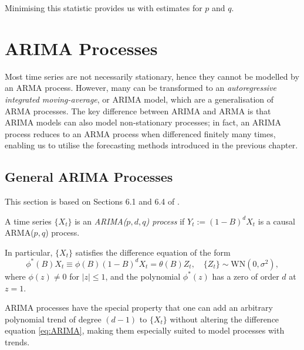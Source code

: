 \documentclass[a4paper, oneside]{discothesis}
\begin{document}
Minimising this statistic provides us with estimates for $p$ and $q$.


\chapter{ARIMA Processes} \label{chap:ARIMA}
Most time series are not necessarily stationary, hence they cannot be modelled by an ARMA process. However, many can be transformed to an \textit{autoregressive integrated moving-average}, or ARIMA model, which are a generalisation of ARMA processes. The key difference between ARIMA and ARMA is that ARIMA models can also model non-stationary processes; in fact, an ARIMA process reduces to an ARMA process when differenced finitely many times, enabling us to utilise the forecasting methods introduced in the previous chapter.

\section{General ARIMA Processes}
This section is based on Sections 6.1 and 6.4 of \cite{itsf}.
\begin{definition}
	A time series $\{X_t\}$ is an \textit{ARIMA($p, d, q$) process} if $Y_t := (1-B)^d X_t$ is a causal ARMA($p, q$) process.
\end{definition}

In particular, $\{X_t\}$ satisfies the difference equation of the form
\begin{equation}
    \label{eq:ARIMA}\phi^*(B)X_t \equiv \phi(B)(1-B)^dX_t = \theta(B)Z_t, \quad \{Z_t\} \sim \mathrm{WN}(0, \sigma^2),
\end{equation}
where $\phi(z) \neq 0$ for $|z| \leq 1$, and the polynomial $\phi^*(z)$ has a zero of order $d$ at $z=1$.

ARIMA processes have the special property that one can add an arbitrary polynomial trend of degree $(d-1)$ to $\{X_t\}$ without altering the difference equation \eqref{eq:ARIMA}, making them especially suited to model processes with trends.
\end{document}
